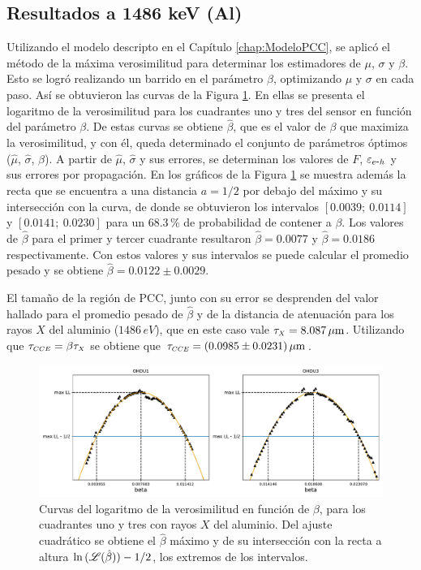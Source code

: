 \subsection{Resultados a 1486 keV (Al)}
\noindent Utilizando el modelo descripto en el Capítulo \ref{chap:ModeloPCC}, se aplicó el método de la máxima verosimilitud para determinar los estimadores de $\mu$, $\sigma$ y $\beta$. Esto se logró realizando un barrido en el parámetro $\beta$, optimizando $\mu$ y $\sigma$ en cada paso. Así se obtuvieron las curvas de la Figura \ref{fig:Al_barridos_beta}. En ellas se presenta el logaritmo de la verosimilitud para los cuadrantes uno y tres del sensor en función del parámetro $\beta$. De estas curvas se obtiene $\hat{\beta}$, que es el valor de $\beta$ que maximiza la verosimilitud, y con él, queda determinado el conjunto de parámetros óptimos ($\hat{\mu}$, $\hat{\sigma}$, $\hat{\beta}$). A partir de $\hat{\mu}$, $\hat{\sigma}$ y sus errores, se determinan los valores de $F$, $\varepsilon_{e\mbox{-}h}$ y sus errores por propagación. En los gráficos de la Figura \ref{fig:Al_barridos_beta} se muestra además la recta que se encuentra a una distancia $a=1/2$ por debajo del máximo y su intersección con la curva, de donde se obtuvieron los intervalos $[0.0039;\ 0.0114]$ y $[0.0141;\ 0.0230]$ para un $68.3\,\%$ de probabilidad de contener a $\beta$. Los valores de $\hat{\beta}$ para el primer y tercer cuadrante resultaron $\hat{\beta} = 0.0077$ y $\hat{\beta}=0.0186$ respectivamente. Con estos valores y sus intervalos se puede calcular el promedio pesado y se obtiene $\hat{\beta} = 0.0122 \pm 0.0029 $.

El tamaño de la región de PCC, junto con su error se desprenden del valor hallado para el promedio pesado de $\hat{\beta}$ y de la distancia de atenuación para los rayos $X$ del aluminio ($1486\,\si{eV}$), que en este caso vale $\tau_{\scaleto{X}{4pt}} = 8.087\,\si{\mu m}$\cite{AttenuationLength}. Utilizando que $\tau_{\scaleto{CCE}{4pt}} = \beta \tau_{\scaleto{X}{4pt}}$ se obtiene que $\tau_{\scaleto{CCE}{4pt}} = (0.0985 \pm 0.0231)\,\si{\mu m} $.
\begin{figure}[h]
    \centering
        \includegraphics[scale=0.5]{Figs/Al_barridos_beta.pdf}
    \caption{Curvas del logaritmo de la verosimilitud en función de $\beta$, para los cuadrantes uno y tres con rayos $X$ del aluminio. Del ajuste cuadrático se obtiene el $\hat{\beta}$ máximo y de su intersección con la recta a altura $\ln{(\mathscr{L}(\hat{\beta}))} - 1/2$, los extremos de los intervalos.}
    \label{fig:Al_barridos_beta}
\end{figure}

